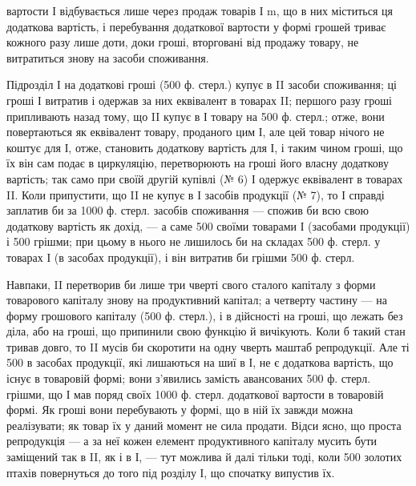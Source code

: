 \parcont{}  %
вартости І відбувається лише через продаж товарів І m, що в них
міститься ця додаткова вартість, і перебування додаткової вартости у
формі грошей триває кожного разу лише доти, доки гроші, вторговані
від продажу товару, не витратиться знову на засоби споживання.

Підрозділ І на додаткові гроші (500 ф. стерл.) купує в II засоби
споживання; ці гроші І витратив і одержав за них еквівалент в товарах II;
першого разу гроші припливають назад тому, що II купує в І товару
на 500 ф. стерл.; отже, вони повертаються як еквівалент товару, проданого
цим І, але цей товар нічого не коштує для І, отже, становить додаткову
вартість для І, і таким чином гроші, що їх він сам
подає в циркуляцію, перетворюють на гроші його
власну додаткову вартість; так само при своїй другій купівлі
(№ 6) І одержує еквівалент в товарах II. Коли припустити, що II не
купує в І засобів продукції (№ 7), то І справді заплатив би за 1000 ф.
стерл. засобів споживання — спожив би всю свою додаткову вартість як
дохід, — а саме 500 своїми товарами І (засобами продукції) і 500 грішми;
при цьому в нього не лишилось би на складах 500 ф. стерл. у товарах І
(в засобах продукції), і він витратив би грішми 500 ф. стерл.

Навпаки, II перетворив би лише три чверті свого сталого капіталу
з форми товарового капіталу знову на продуктивний капітал; а четверту
частину — на форму грошового капіталу (500 ф. стерл.), і в дійсності на
гроші, що лежать без діла, або на гроші, що припинили свою функцію
й вичікують. Коли б такий стан тривав довго, то II мусів би скоротити
на одну чверть маштаб репродукції. Але ті 500 в засобах продукції,
які лишаються на шиї в І, не є додаткова вартість, що існує в товаровій
формі; вони з’явились замість авансованих 500 ф. стерл. грішми, що І мав
поряд своїх 1000 ф. стерл. додаткової вартости в товаровій формі. Як
гроші вони перебувають у формі, що в ній їх завжди можна реалізувати;
як товар їх у даний момент не сила продати. Відси ясно, що проста
репродукція — а за неї кожен елемент продуктивного капіталу мусить бути
заміщений так в II, як і в І, — тут можлива й далі тільки тоді, коли 500 золотих
птахів повернуться до того під розділу І, що спочатку випустив їх.

